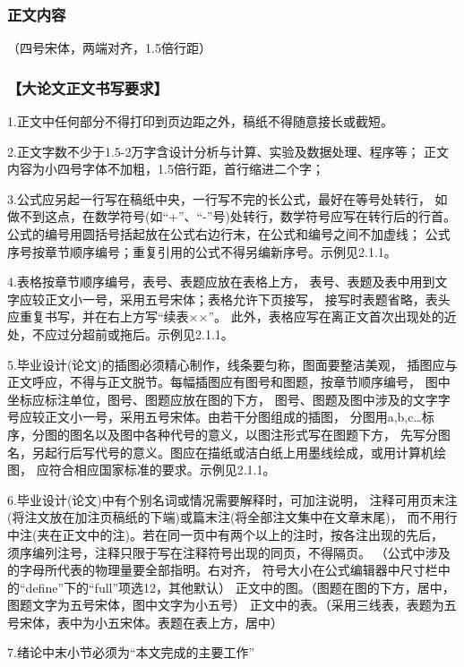 \begin{appendices}
    \subsubsection*{正文内容}
    （四号宋体，两端对齐，1.5倍行距）

    \subsubsection*{【大论文正文书写要求】}
    1.正文中任何部分不得打印到页边距之外，稿纸不得随意接长或截短。

    2.正文字数不少于1.5-2万字含设计分析与计算、实验及数据处理、程序等；
    正文内容为小四号字体不加粗，1.5倍行距，首行缩进二个字；

    3.公式应另起一行写在稿纸中央，一行写不完的长公式，最好在等号处转行，
    如做不到这点，在数学符号(如“+”、“-”号)处转行，数学符号应写在转行后的行首。
    公式的编号用圆括号括起放在公式右边行末，在公式和编号之间不加虚线；
    公式序号按章节顺序编号；重复引用的公式不得另编新序号。示例见2.1.1。

    4.表格按章节顺序编号，表号、表题应放在表格上方，
    表号、表题及表中用到文字应较正文小一号，采用五号宋体；表格允许下页接写，
    接写时表题省略，表头应重复书写，并在右上方写“续表××”。
    此外，表格应写在离正文首次出现处的近处，不应过分超前或拖后。示例见2.1.1。

    5.毕业设计(论文)的插图必须精心制作，线条要匀称，图面要整洁美观，
    插图应与正文呼应，不得与正文脱节。每幅插图应有图号和图题，按章节顺序编号，
    图中坐标应标注单位，图号、图题应放在图的下方，
    图号、图题及图中涉及的文字字号应较正文小一号，采用五号宋体。由若干分图组成的插图，
    分图用a,b,c…标序，分图的图名以及图中各种代号的意义，以图注形式写在图题下方，
    先写分图名，另起行后写代号的意义。图应在描纸或洁白纸上用墨线绘成，或用计算机绘图，
    应符合相应国家标准的要求。示例见2.1.1。

    6.毕业设计(论文)中有个别名词或情况需要解释时，可加注说明，
    注释可用页末注(将注文放在加注页稿纸的下端)或篇末注(将全部注文集中在文章末尾)，
    而不用行中注(夹在正文中的注)。若在同一页中有两个以上的注时，按各注出现的先后，
    须序编列注号，注释只限于写在注释符号出现的同页，不得隔页。
    （公式中涉及的字母所代表的物理量要全部指明。右对齐，
    符号大小在公式编辑器中尺寸栏中的“define”下的“full”项选12，其他默认）
    正文中的图。（图题在图的下方，居中，图题文字为五号宋体，图中文字为小五号）
    正文中的表。（采用三线表，表题为五号宋体，表中为小五宋体。表题在表上方，居中）

    7.绪论中末小节必须为“本文完成的主要工作”
    

\end{appendices}
